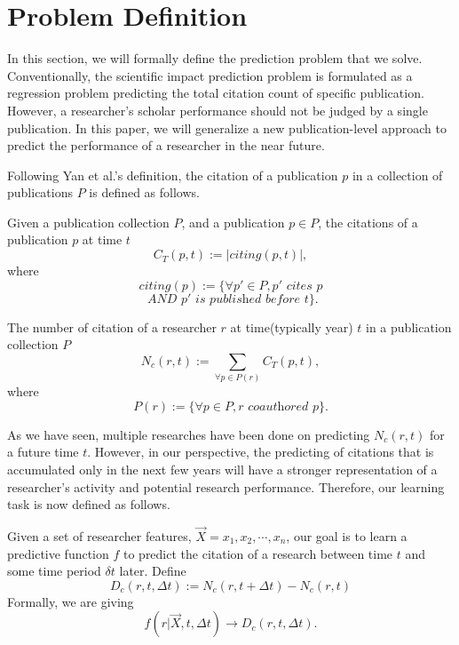 \section{Problem Definition}
In this section, we will formally define the prediction problem that we solve.
Conventionally, the scientific impact prediction problem is formulated as a regression problem predicting the total citation count of specific publication.
However, a researcher's scholar performance should not be judged by a single publication.
In this paper, we will generalize a new publication-level approach to predict the performance of a researcher in the near future.

Following Yan et al.'s definition, the citation of a publication $p$ in a collection of publications $P$ is defined as follows.

\begin{definition}
Given a publication collection $P$, and a publication $p\in P$, the citations of a publication $p$ at time $t$
\[C_T(p,t):=|citing(p,t)|,\]
where
\[citing(p):=\{\forall p'\in P, p' \textit{ cites } p \]
\[\textit{ AND } p' \textit{ is published before } t \}.\]
\end{definition}

\begin{definition}
The number of citation of a researcher $r$ at time(typically year) $t$ in a publication collection $P$
\[N_c(r,t):=\sum_{\forall p \in P(r)} C_T(p,t),\]
where
\[P(r):=\{\forall p \in P, r \textit{ coauthored } p\}.\]
\end{definition}

As we have seen, multiple researches have been done on predicting $N_c(r,t)$ for a future time $t$.
However, in our perspective, the predicting of citations that is accumulated only in the next few years
will have a stronger representation of a researcher's activity and potential research performance.
Therefore, our learning task is now defined as follows.

\begin{definition}
Given a set of researcher features, $\vec{X}=x_1,x_2,\cdots,x_n$, our goal is to learn a predictive function $f$ to predict the citation
of a research between time $t$ and some time period $\delta t$ later. Define
\[D_c(r,t,\Delta t):=N_c(r,t+\Delta t)-N_c(r,t)\]
Formally, we are giving
\[f(r|\vec{X},t,\Delta t)\rightarrow D_c(r,t,\Delta t).\]
\end{definition}
